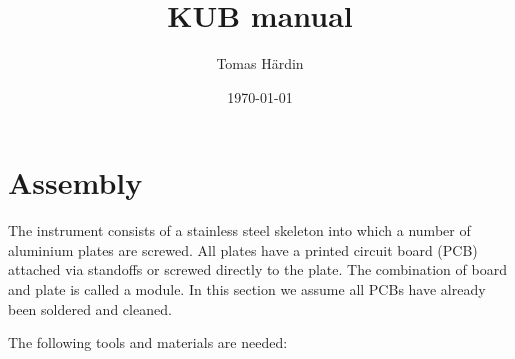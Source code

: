 \documentclass{article}
\begin{document}
\lstset{basicstyle=\ttfamily} %


\title{KUB manual}
\date{\today}
\author{Tomas H\"ardin}

\maketitle

\newpage

\tableofcontents
\listoffigures
\listoftables

\newpage

\section{Assembly}


The instrument consists of a stainless steel skeleton into which a number of aluminium plates are screwed.
All plates have a printed circuit board (PCB) attached via standoffs or screwed directly to the plate.
The combination of board and plate is called a module.
In this section we assume all PCBs have already been soldered and cleaned.

The following tools and materials are needed:
\end{document}
